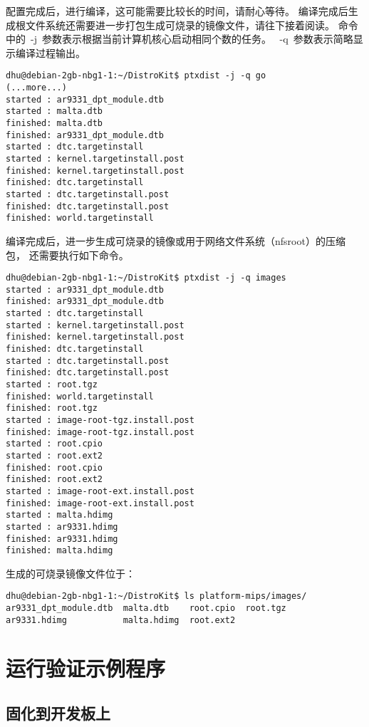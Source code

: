 配置完成后，进行编译，这可能需要比较长的时间，请耐心等待。
编译完成后生成根文件系统还需要进一步打包生成可烧录的镜像文件，请往下接着阅读。
命令中的~-j~参数表示根据当前计算机核心启动相同个数的任务。
~-q~参数表示简略显示编译过程输出。

\begin{lstlisting}
dhu@debian-2gb-nbg1-1:~/DistroKit$ ptxdist -j -q go
(...more...)
started : ar9331_dpt_module.dtb
started : malta.dtb
finished: malta.dtb
finished: ar9331_dpt_module.dtb
started : dtc.targetinstall
started : kernel.targetinstall.post
finished: kernel.targetinstall.post
finished: dtc.targetinstall
started : dtc.targetinstall.post
finished: dtc.targetinstall.post
finished: world.targetinstall
\end{lstlisting}

编译完成后，进一步生成可烧录的镜像或用于网络文件系统（nfsroot）的压缩包，
还需要执行如下命令。

\begin{lstlisting}
dhu@debian-2gb-nbg1-1:~/DistroKit$ ptxdist -j -q images
started : ar9331_dpt_module.dtb
finished: ar9331_dpt_module.dtb
started : dtc.targetinstall
started : kernel.targetinstall.post
finished: kernel.targetinstall.post
finished: dtc.targetinstall
started : dtc.targetinstall.post
finished: dtc.targetinstall.post
started : root.tgz
finished: world.targetinstall
finished: root.tgz
started : image-root-tgz.install.post
finished: image-root-tgz.install.post
started : root.cpio
started : root.ext2
finished: root.cpio
finished: root.ext2
started : image-root-ext.install.post
finished: image-root-ext.install.post
started : malta.hdimg
started : ar9331.hdimg
finished: ar9331.hdimg
finished: malta.hdimg
\end{lstlisting}

生成的可烧录镜像文件位于：

\begin{lstlisting}
dhu@debian-2gb-nbg1-1:~/DistroKit$ ls platform-mips/images/
ar9331_dpt_module.dtb  malta.dtb    root.cpio  root.tgz
ar9331.hdimg           malta.hdimg  root.ext2
\end{lstlisting}

\chapter{运行验证示例程序}

\section{固化到开发板上}

